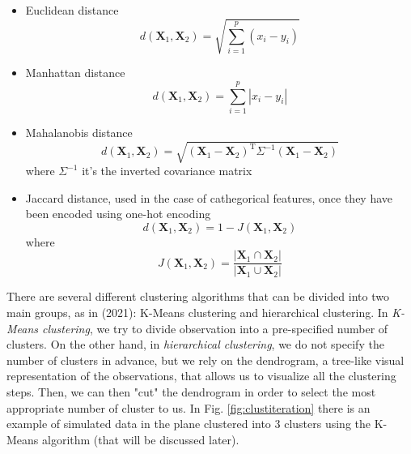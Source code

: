 \begin{itemize}
    \item Euclidean distance
\begin{equation}
    \label{eq:euclidean}
    d\left(\mathbf{X}_1,\mathbf{X}_2\right) = \sqrt{\sum_{i=1}^p\left(x_i-y_i \right)}
\end{equation}
\item Manhattan distance
\begin{equation}
    \label{eq:mandistance}
    d\left(\mathbf{X}_1,\mathbf{X}_2\right) = \sum_{i=1}^p\left|x_i-y_i \right|
\end{equation}

\item Mahalanobis distance
\begin{equation}
    \label{eq:mahadistance}
    d(\mathbf{X}_1, \mathbf{X}_2) = \sqrt{(\mathbf{X}_1 - \mathbf{X}_2)^\mathrm{T} \Sigma^{-1} (\mathbf{X}_1 - \mathbf{X}_2)}
\end{equation}
where $\Sigma^{-1}$ it's the inverted covariance matrix
\item Jaccard distance, used in the case of cathegorical features, once they have been encoded using one-hot encoding
\begin{equation}
    \label{eq:jaccard}
    d\left(\mathbf{X}_1, \mathbf{X}_2\right) = 1 - J\left(\mathbf{X}_1, \mathbf{X}_2\right)
\end{equation}
where 
\begin{equation}
J\left(\mathbf{X}_1, \mathbf{X}_2\right) = \frac{\left|\mathbf{X}_1 \cap \mathbf{X}_2\right|}{\left|\mathbf{X}_1 \cup \mathbf{X}_2\right|}    
\end{equation}
\end{itemize}
There are several different clustering algorithms that can be divided into two main groups, as in \citeauthor{james_introduction_2021} (2021): K-Means clustering and hierarchical clustering. In \emph{K-Means clustering}, we try to divide observation into a pre-specified number of clusters. On the other hand, in \emph{hierarchical clustering}, we do not specify the number of clusters in advance, but we rely on the dendrogram, a tree-like visual representation of the observations, that allows us to visualize all the clustering steps. Then, we can then "cut" the dendrogram in order to select the most appropriate number of cluster to us. In Fig. \ref{fig:clustiteration} there is an example of simulated data in the plane clustered into 3 clusters using the K-Means algorithm (that will be discussed later).

